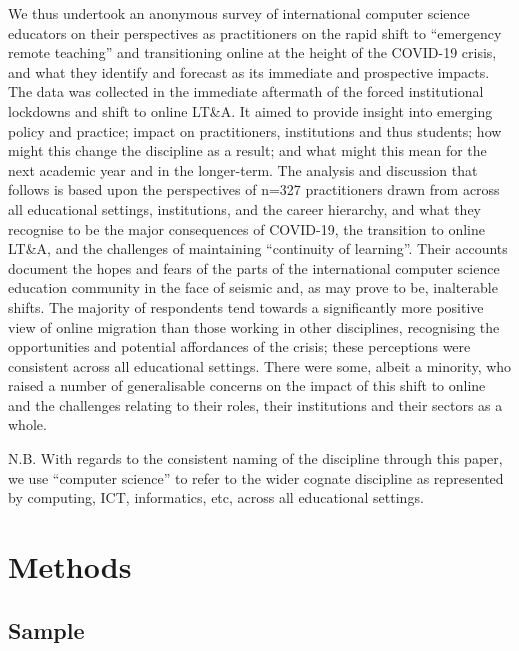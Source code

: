\documentclass[conference]{IEEEtran}
\begin{document}
We thus undertook an anonymous survey of international computer
science educators on their perspectives as practitioners on the rapid shift
to ``emergency remote teaching'' and transitioning online at the
height of the COVID-19 crisis, and what they identify and forecast as
its immediate and prospective impacts. The data was collected in the
immediate aftermath of the forced institutional lockdowns and shift to
online LT\&A. It aimed to provide insight into emerging policy and
practice; impact on practitioners, institutions and thus students; how
might this change the discipline as a result; and what might this mean
for the next academic year and in the longer-term. The analysis and
discussion that follows is based upon the perspectives of n=327
practitioners drawn from across all educational settings,
institutions, and the career hierarchy, and what they recognise to be
the major consequences of COVID-19, the transition to online LT\&A,
and the challenges of maintaining ``continuity of learning''. Their
accounts document the hopes and fears of the parts of the
international computer science education community in the face of
seismic and, as may prove to be, inalterable shifts. The majority of
respondents tend towards a significantly more positive view of online
migration than those working in other disciplines, recognising the
opportunities and potential affordances of the crisis; these
perceptions were consistent across all educational settings. There
were some, albeit a minority, who raised a number of generalisable
concerns on the impact of this shift to online and the challenges
relating to their roles, their institutions and their sectors as a
whole.


N.B. With regards to the consistent naming of the discipline through this
paper, we use ``computer science'' to refer to the wider cognate
discipline as represented by computing, ICT, informatics, etc, across
all educational settings.


\section{Methods}\label{methods}

\subsection{Sample}
\end{document}
